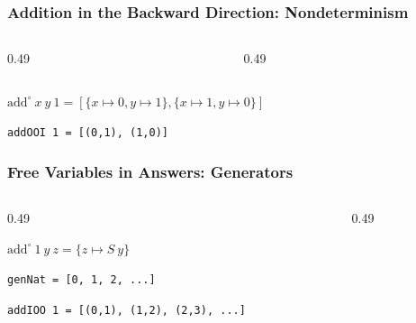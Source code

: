\documentclass[xcolor={dvipsnames}, aspectratio=169]{beamer}
\begin{document}
%     
%     


\begin{frame}[fragile]
  \frametitle{Addition in the Backward Direction: Nondeterminism}
\begin{columns}
  \begin{column}[t]{0.49\textwidth}
    
  \end{column}
  \begin{column}[t]{0.49\textwidth}
    
  \end{column}
\end{columns}

\vfill
$\text{add}^{\circ}\ x\ y\ 1 = \left[\{x \mapsto  0, y \mapsto  1\}, \{x \mapsto  1, y \mapsto  0\} \right]$

\vfill

\lstinline{addOOI 1 = [(0,1), (1,0)]}

\end{frame}

\begin{frame}[fragile]
  \frametitle{Free Variables in Answers: Generators}
\begin{columns}
  \begin{column}[t]{0.49\textwidth}
    

    \vspace{0.5cm}
    $\text{add}^{\circ}\ 1\ y\ z = \{z \mapsto S\ y\}$

    \vspace{0.5cm}

    \lstinline{genNat = [0, 1, 2, ...]}

    \vspace{0.5cm}

    \lstinline{addIOO 1 = [(0,1), (1,2), (2,3), ...]} 
  \end{column}
  \begin{column}[t]{0.49\textwidth}
    
  \end{column}
\end{columns}
\end{frame}
\end{document}
